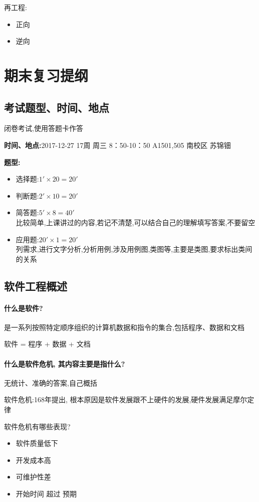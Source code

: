 \documentclass[UTF8,a4paper]{ctexart}
\begin{document}
再工程:
\begin{itemize}
  \item 正向
  \item 逆向
\end{itemize}

\section{期末复习提纲}
\subsection{考试题型、时间、地点}
闭卷考试,使用答题卡作答

\textbf{时间、地点:}2017-12-27 17周 周三 8：50-10：50 A1501,505 南校区 苏锦钿

\textbf{题型:}
\begin{itemize}
  \item 选择题:$1' \times 20= 20'$
  \item 判断题:$2' \times 10 = 20'$
  \item 简答题:$5' \times 8 = 40'$\\
  比较简单,上课讲过的内容,若记不清楚,可以结合自己的理解填写答案,不要留空
  \item 应用题:$20' \times 1 = 20'$\\
  列需求,进行文字分析,分析用例,涉及用例图,类图等,主要是类图,要求标出类间的关系
\end{itemize}

\subsection{软件工程概述}
\paragraph{什么是软件?}是一系列按照特定顺序组织的计算机数据和指令的集合,包括程序、数据和文档

软件 = 程序 + 数据 + 文档

\paragraph{什么是软件危机, 其内容主要是指什么?}
无统计、准确的答案,自己概括

软件危机:168年提出, 根本原因是软件发展跟不上硬件的发展,硬件发展满足摩尔定律

软件危机有哪些表现?
\begin{itemize}
  \item 软件质量低下
  \item 开发成本高
  \item 可维护性差
  \item 开始时间 超过 预期
\end{itemize}
\end{document}
